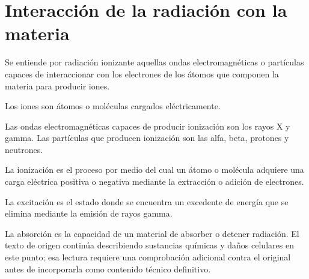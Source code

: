\chapter{Interacción de la radiación con la materia}

Se entiende por radiación ionizante aquellas ondas electromagnéticas o partículas capaces de interaccionar con los electrones de los átomos que componen la materia para producir iones.

Los iones son átomos o moléculas cargados eléctricamente.

Las ondas electromagnéticas capaces de producir ionización son los rayos X y gamma. Las partículas que producen ionización son las alfa, beta, protones y neutrones.

La ionización es el proceso por medio del cual un átomo o molécula adquiere una carga eléctrica positiva o negativa mediante la extracción o adición de electrones.

La excitación es el estado donde se encuentra un excedente de energía que se elimina mediante la emisión de rayos gamma.

La absorción es la capacidad de un material de absorber o detener radiación. El texto de origen continúa describiendo sustancias químicas y daños celulares en este punto; esa lectura requiere una comprobación adicional contra el original antes de incorporarla como contenido técnico definitivo.
